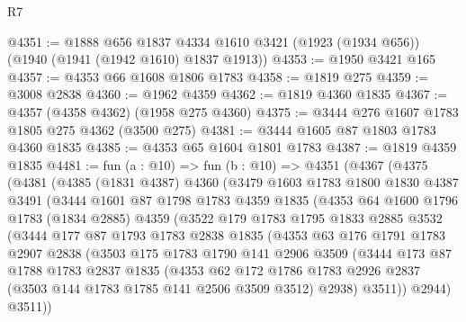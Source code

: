 \begin{lexlean}{R7}
\begin{coremodule}
@4351 := @1888
    @656
    @1837
    @4334
    @1610
    @3421
    (@1923 (@1934 @656))
    (@1940 (@1941 (@1942 @1610) @1837 @1913))
@4353 := @1950 @3421 @165
@4357 := @4353 @66 @1608 @1806 @1783
@4358 := @1819 @275
@4359 := @3008 @2838
@4360 := @1962 @4359
@4362 := @1819 @4360 @1835
@4367 := @4357 (@4358 @4362) (@1958 @275 @4360)
@4375 := @3444 @276 @1607 @1783 @1805 @275 @4362 (@3500 @275)
@4381 := @3444 @1605 @87 @1803 @1783 @4360 @1835
@4385 := @4353 @65 @1604 @1801 @1783
@4387 := @1819 @4359 @1835
@4481 := fun (a : @10) =>
  fun (b : @10) =>
  @4351
    (@4367
      (@4375
        (@4381
          (@4385
            (@1831 @4387)
            @4360
            (@3479
              @1603
              @1783
              @1800
              @1830
              @4387
              @3491
              (@3444
                @1601
                @87
                @1798
                @1783
                @4359
                @1835
                (@4353
                  @64
                  @1600
                  @1796
                  @1783
                  (@1834 @2885)
                  @4359
                  (@3522
                    @179
                    @1783
                    @1795
                    @1833
                    @2885
                    @3532
                    (@3444
                      @177
                      @87
                      @1793
                      @1783
                      @2838
                      @1835
                      (@4353
                        @63
                        @176
                        @1791
                        @1783
                        @2907
                        @2838
                        (@3503
                          @175
                          @1783
                          @1790
                          @141
                          @2906
                          @3509
                          (@3444
                            @173
                            @87
                            @1788
                            @1783
                            @2837
                            @1835
                            (@4353
                              @62
                              @172
                              @1786
                              @1783
                              @2926
                              @2837
                              (@3503 @144 @1783 @1785 @141 @2506 @3509 @3512)
                              @2938)
                            @3511))
                        @2944)
                      @3511))

\end{coremodule}
\end{lexlean}
